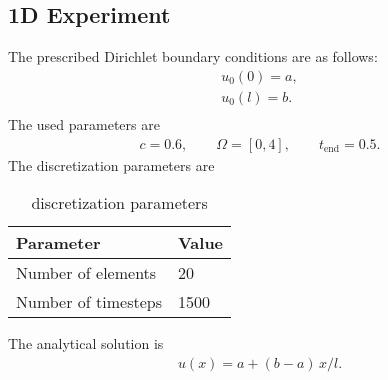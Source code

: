 \begin{frame}
\subsection{1D Experiment}
%
The prescribed Dirichlet boundary conditions are as follows:
\begin{equation*}
  \begin{array}{lll}
    u_0(0) = a,\\[4mm]
    u_0(l) = b.\\[4mm]
  \end{array}
\end{equation*}
The used parameters are
\begin{equation*}
  \begin{array}{lll}
    c = 0.6,\qquad \Omega = [0,4], \qquad t_\text{end}=0.5.
  \end{array}
\end{equation*}
The discretization parameters are
\begin{table}[h!]
  \begin{center}
    \begin{tabular}{l|l}
      \textbf{Parameter} & \textbf{Value}\\
      \hline
      Number of elements & 20\\
      Number of timesteps & 1500\\
    \end{tabular}
  \end{center}
  \caption{discretization parameters}
  \label{tab:table1}
\end{table}
%
The analytical solution is
\begin{equation*}
  \begin{array}{lll}
    u(x) = a + (b-a)\,x/l.
  \end{array}
\end{equation*}
%
\end{frame}


